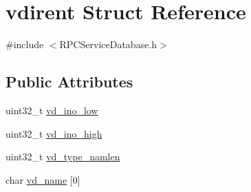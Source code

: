 \hypertarget{structvdirent}{\section{vdirent Struct Reference}
\label{structvdirent}
}


{\ttfamily \#include $<$R\+P\+C\+Service\+Database.\+h$>$}

\subsection*{Public Attributes}
\begin{DoxyCompactItemize}
\item 
uint32\+\_\+t \hyperlink{structvdirent_aa57729301d88e26ed65157133b57b882}{vd\+\_\+ino\+\_\+low}
\item 
uint32\+\_\+t \hyperlink{structvdirent_aa8f0e831b95356f396fa8beebbe811dd}{vd\+\_\+ino\+\_\+high}
\item 
uint32\+\_\+t \hyperlink{structvdirent_a2c96bd97a017e84589f4bdc7ea7df02f}{vd\+\_\+type\+\_\+namlen}
\item 
char \hyperlink{structvdirent_ab175f044897eb0c2f66c359651ef11d6}{vd\+\_\+name} \mbox{[}0\mbox{]}
\end{DoxyCompactItemize}


